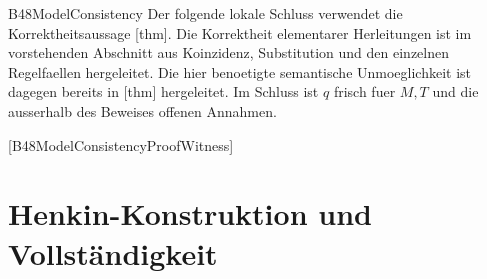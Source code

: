 






{B48ModelConsistency}{
}
\noindent
Der folgende lokale Schluss verwendet die Korrektheitsaussage
[thm]. Die Korrektheit elementarer
Herleitungen ist im vorstehenden Abschnitt aus Koinzidenz,
Substitution und den einzelnen Regelfaellen hergeleitet.
Die hier benoetigte semantische Unmoeglichkeit ist dagegen bereits in
[thm] hergeleitet.
Im Schluss ist \(q\) frisch fuer \(M,T\) und die ausserhalb des
Beweises offenen Annahmen.
\begin{tabproofsplitwide}
 [B48ModelConsistencyProofWitness]
   {}
   {}
   {}
 \closeproofpartwideindR

  \proofstepwidestar[1,4]{\bot}
   {}
   {}
 \closeproofpartwide
\end{tabproofsplitwide}

\section{Henkin-Konstruktion und Vollständigkeit}

